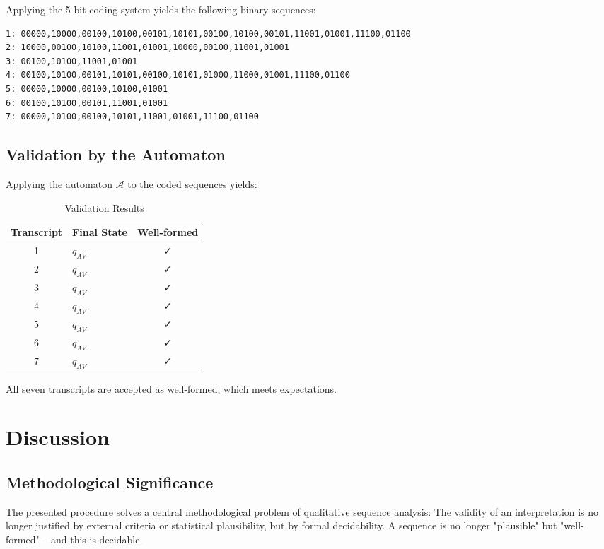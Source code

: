 \documentclass[
  12pt,
  a4paper,
  oneside,
  titlepage
]{article}
\begin{document}
Applying the 5-bit coding system yields the following binary sequences:

\begin{lstlisting}[caption=Coded Terminal Symbol Strings]
1: 00000,10000,00100,10100,00101,10101,00100,10100,00101,11001,01001,11100,01100
2: 10000,00100,10100,11001,01001,10000,00100,11001,01001
3: 00100,10100,11001,01001
4: 00100,10100,00101,10101,00100,10101,01000,11000,01001,11100,01100
5: 00000,10000,00100,10100,01001
6: 00100,10100,00101,11001,01001
7: 00000,10100,00100,10101,11001,01001,11100,01100
\end{lstlisting}

\subsection{Validation by the Automaton}

Applying the automaton \(\mathcal{A}\) to the coded sequences yields:

\begin{table}[h]
\centering
\caption{Validation Results}
\label{tab:validation}
\begin{tabular}{@{} c l c @{}}
\toprule
\textbf{Transcript} & \textbf{Final State} & \textbf{Well-formed} \\
\midrule
1 & \(q_{AV}\) & ✓ \\
2 & \(q_{AV}\) & ✓ \\
3 & \(q_{AV}\) & ✓ \\
4 & \(q_{AV}\) & ✓ \\
5 & \(q_{AV}\) & ✓ \\
6 & \(q_{AV}\) & ✓ \\
7 & \(q_{AV}\) & ✓ \\
\bottomrule
\end{tabular}
\end{table}

All seven transcripts are accepted as well-formed, which meets expectations.

\section{Discussion}

\subsection{Methodological Significance}

The presented procedure solves a central methodological problem of qualitative 
sequence analysis: The validity of an interpretation is no longer justified by 
external criteria or statistical plausibility, but by formal decidability. A 
sequence is no longer "plausible" but "well-formed" – and this is decidable.
\end{document}
